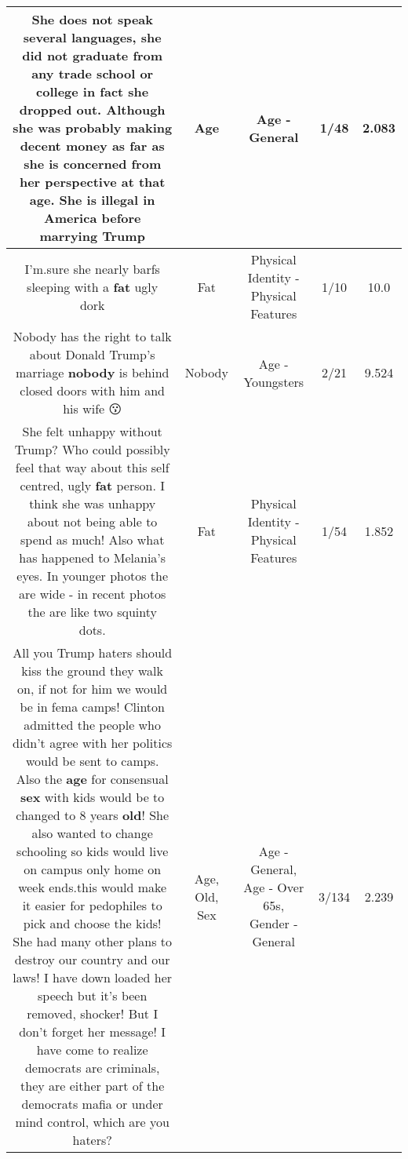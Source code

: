 \documentclass[11pt]{article}
\newlength\mylength
\begin{document}
\begin{center}
\begin{longtable}{|C{.65\mylength}|C{.30\mylength}|C{.12\mylength}|C{.12\mylength}|C{.12\mylength}|}
  \small She does not speak several languages, she did not graduate from any trade school or college in fact she dropped out. Although she was probably making decent money as far as she is concerned from her perspective at that \textbf{age}. She is illegal in America before marrying Trump\normalsize   & Age & Age - General & 1/48 & 2.083 \\  \hline
  \small I'm.sure she nearly barfs sleeping with a \textbf{fat} ugly dork\normalsize   & Fat & Physical Identity - Physical Features & 1/10 & 10.0 \\  \hline
  \small Nobody has the right to talk about Donald Trump's marriage \textbf{nobody} is behind closed doors with him and his wife 😗\normalsize   & Nobody & Age - Youngsters & 2/21 & 9.524 \\  \hline
  \small She felt unhappy without Trump?  Who could possibly feel that way about  this self centred, ugly \textbf{fat} person.  I think she was unhappy about not being able to spend as much!  Also what has happened to Melania's eyes.  In younger photos the are wide - in recent photos the are like two squinty dots.\normalsize   & Fat & Physical Identity - Physical Features & 1/54 & 1.852 \\  \hline
  \small All you Trump haters should kiss the ground they walk on, if not for him we would be in fema camps! Clinton admitted the people who didn't agree with her politics would be sent to camps. Also the \textbf{age} for consensual \textbf{sex} with kids would be to changed to 8 years \textbf{old}! She also wanted to change schooling so kids would live  on campus only home on week ends.this would make it easier for pedophiles to pick and choose the kids! She had many other plans to destroy our country and our laws! I have down loaded her speech but it's been removed, shocker! But I don't forget her message! I have come to realize democrats are criminals, they are either part of the democrats mafia or under mind control, which are you haters?\normalsize   & Age, Old, Sex & Age - General, Age - Over 65s, Gender - General & 3/134 & 2.239 \\  \hline

\end{longtable}
\end{center}
\end{document}
